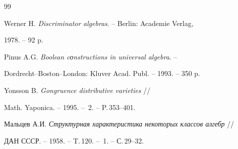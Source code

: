 \begin{thebibliography}{99}


Werner H. {\em Discriminator algebras}. -- Berlin: Academie Verlag,


1978. -- 92 p.




Pinus A.G. {\em Boolean cоnstructions in universal algebra}. -- 


Dordrecht--Boston--London: Kluver Acad. Publ. -- 1993. -- 350 p.




Yonsson B. {\em Gongruence distributive varieties} //


Math. Yaponica. -- 1995. -- \No\,2. -- P.\,353--401.




Мальцев А.И. {\em Структурная характеристика некоторых классов алгебр} //


ДАН СССР. -- 1958. -- T.\,120. -- \No\,1. -- С.\,29--32.





\end{thebibliography}





\vskip 2cm












\label{end}





